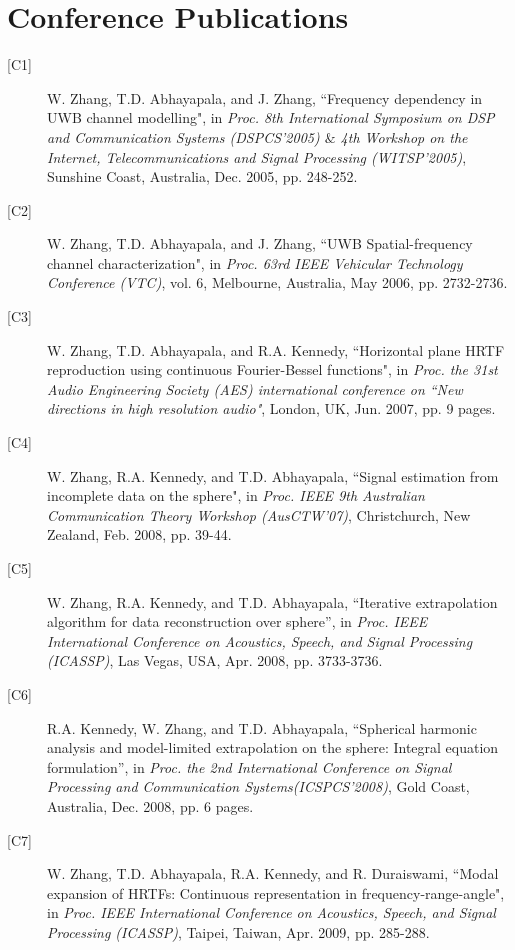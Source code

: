 \documentclass[10pt]{article}
\begin{document}
\section*{Conference Publications}

\begin{description}

\item[{[}C1{]}]W. Zhang, T.D. Abhayapala, and J. Zhang, ``Frequency dependency in UWB channel modelling", in \emph{Proc. 8th International Symposium on DSP and Communication Systems (DSPCS'2005) $\&$ 4th Workshop on the Internet, Telecommunications and Signal
Processing (WITSP'2005)}, Sunshine Coast, Australia, Dec. 2005, pp. 248-252.

\item[{[}C2{]}]W. Zhang, T.D. Abhayapala, and J. Zhang, ``UWB Spatial-frequency channel characterization",
in \emph{Proc. 63rd IEEE Vehicular Technology Conference (VTC)}, vol. 6, Melbourne, Australia, May 2006, pp. 2732-2736.

\item[{[}C3{]}]W. Zhang, T.D. Abhayapala, and R.A. Kennedy, ``Horizontal plane HRTF reproduction using continuous Fourier-Bessel functions",
in \emph{Proc. the 31st Audio Engineering Society (AES) international conference on ``New directions in high resolution audio"}, London, UK,
Jun. 2007, pp. 9 pages.

\item[{[}C4{]}]W. Zhang, R.A. Kennedy, and T.D. Abhayapala, ``Signal estimation from incomplete data on the sphere",
in \emph{Proc. IEEE 9th Australian Communication Theory Workshop (AusCTW'07)}, Christchurch, New Zealand, Feb. 2008, pp. 39-44.

\item[{[}C5{]}]W. Zhang, R.A. Kennedy, and T.D. Abhayapala, ``Iterative extrapolation algorithm for data reconstruction over sphere'',
in \emph{Proc. IEEE International Conference on Acoustics, Speech, and Signal Processing (ICASSP)}, Las Vegas, USA, Apr. 2008, pp. 3733-3736.

\item[{[}C6{]}]R.A. Kennedy, W. Zhang, and T.D. Abhayapala, ``Spherical harmonic analysis and model-limited
extrapolation on the sphere: Integral equation formulation'', in \emph{Proc. the 2nd International Conference on Signal Processing and
Communication Systems(ICSPCS'2008)}, Gold Coast, Australia, Dec. 2008, pp. 6 pages.

\item[{[}C7{]}]W. Zhang, T.D. Abhayapala, R.A. Kennedy, and R. Duraiswami, ``Modal expansion of HRTFs:
Continuous representation in frequency-range-angle", in \emph{Proc. IEEE International Conference on Acoustics, Speech, 
and Signal Processing (ICASSP)}, Taipei, Taiwan, Apr. 2009, pp. 285-288.


\end{description}
\end{document}

